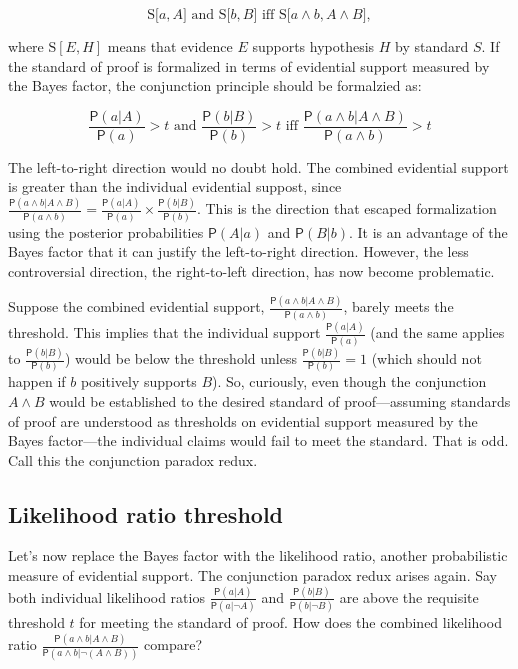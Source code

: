 \documentclass[10pt,dvipsnames,enabledeprecatedfontcommands]{scrartcl}
\newcommand{\et}{\wedge}
\newcommand{\pr}[1]{\mathsf{P}(#1)}
\begin{document}
\[\text{S[$a, A$] and S[$b, B$] iff S[$a \wedge b, A\wedge B$]},\]

\noindent where \(\text{S}[E, H]\) means that evidence \(E\) supports
hypothesis \(H\) by standard \(S\). If the standard of proof is
formalized in terms of evidential support measured by the Bayes factor,
the conjunction principle should be formalzied as:

\[  \text{ $\frac{\pr{a | A }}{\pr{a}}>t$ and $\frac{\pr{ b | B}}{\pr{b}}>t$ iff $\frac{\pr{a \et b | A \et B}}{\pr{a \et b}}>t$ } \]

\noindent The left-to-right direction would no doubt hold. The combined
evidential support is greater than the individual evidential suppost,
since
\(\frac{\pr{a \et b | A \et B}}{\pr{a \et b}} = \frac{\pr{a |A}}{\pr{a}} \times \frac{\pr{b |B}}{\pr{b}}\).
This is the direction that escaped formalization using the posterior
probabilities \(\pr{A | a}\) and \(\pr{B | b}\). It is an advantage of
the Bayes factor that it can justify the left-to-right direction.
However, the less controversial direction, the right-to-left direction,
has now become problematic.

Suppose the combined evidential support,
\(\frac{\pr{a \et b | A \et B}}{\pr{a \et b}}\), barely meets the
threshold. This implies that the individual support
\(\frac{\pr{a |A}}{\pr{a}}\) (and the same applies to
\(\frac{\pr{b |B}}{\pr{b}}\)) would be below the threshold unless
\(\frac{\pr{b |B}}{\pr{b}}=1\)
(which should not happen if \(b\) positively supports \(B\)). So,
curiously, even though the conjunction \(A\et B\) would be established
to the desired standard of proof---assuming standards of proof are
understood as thresholds on evidential support measured by the Bayes
factor---the individual claims would fail to meet the standard. That is
odd. Call this the conjunction paradox redux.

\hypertarget{likelihood-ratio-threshold}{%
\subsection{Likelihood ratio
threshold}\label{likelihood-ratio-threshold}}

Let's now replace the Bayes factor with the likelihood ratio, another
probabilistic measure of evidential support. The conjunction paradox
redux arises again. Say both individual likelihood ratios
\(\frac{\pr{a |A}}{\pr{a | \neg A}}\) and
\(\frac{\pr{b |B}}{\pr{b | \neg B}}\) are above the requisite threshold
\(t\) for meeting the standard of proof. How does the combined
likelihood ratio
\(\frac{\pr{ a \et b |A \et B}}{\pr{a \et b | \neg (A \et B)}}\)
compare?
\end{document}

